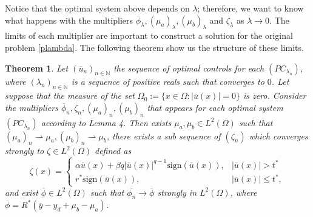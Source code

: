 \documentclass[11pt,a4paper]{amsart}
\newcommand{\om}{\Omega}
\newcommand{\sign}{\mathrm{sign}}
\newtheorem{theorem}{{Theorem}}
\begin{document}
Notice that the optimal system above depends on $\lambda$; therefore, we want to know what happens with the multipliers $\overline{\phi}_{\lambda}, (\mu_a)_{\lambda}, (\mu_b)_{\lambda}$ and $\zeta_{\lambda}$ as $\lambda\to 0$. The limits of each multiplier are important to construct a solution for the original problem \eqref{plambda}. The following theorem show us the structure of these limits.
\begin{theorem}
    Let $(\overline{u}_n)_{n\in\mathbb{N}}$ the sequence of optimal controls for each $(PC_{\lambda_n})$, where $(\lambda_n)_{n\in \mathbb{N}}$ is a sequence of positive reals such that converges to $0$. Let suppose that the measure of the set $\Omega_{0}:=\{x\in \om: |\overline{u}(x)|=0\}$ is zero. Consider the multipliers $\overline{\phi}_n, \zeta_{n}, (\mu_a)_n, (\mu_b)_n$ that appears for each optimal system $(PC_{\lambda_n})$ according to Lemma 4. Then exists $\mu_a, \mu_b\in L^2(\om)$ such that $(\mu_a)_n\rightharpoonup \mu_a, (\mu_b)_n\rightharpoonup \mu_b$, there exists a sub sequence of $(\zeta_n)$ which converges strongly to $\zeta\in L^2(\Omega)$ defined as
    \[
    \zeta(x)=\begin{cases}
        \alpha \overline{u}(x)+\beta q |\overline{u}(x)|^{q-1}\sign(\overline{u}(x)), &|\overline{u}(x)|>t^*\\
            r^*\sign(\overline{u}(x)), &|\overline{u}(x)|\le t^*,
    \end{cases}
    \] 
    and exist $\overline{\phi}\in L^2(\om)$ such that $\overline{\phi_n}\to \overline{\phi}$ strongly in $L^2(\Omega)$, where $\overline{\phi}=R^*(\overline{y}-y_d+\mu_b-\mu_a)$.
\end{theorem}
\end{document}
